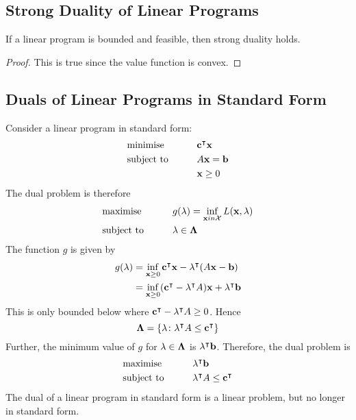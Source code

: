 \subsection{Strong Duality of Linear Programs}
\begin{theorem}
	If a linear program is bounded and feasible, then strong duality holds.
\end{theorem}
\begin{proof}
	This is true since the value function is convex.
\end{proof}

\subsection{Duals of Linear Programs in Standard Form}
Consider a linear program in standard form:
\begin{alignat*}{2}
	 & \text{minimise}   & \qquad & \vb c^\intercal \vb x \\
	 & \text{subject to} &        & A \vb x = \vb b        \\
	 &                   &        & \vb x \geq 0
\end{alignat*}
The dual problem is therefore
\begin{alignat*}{2}
	 & \text{maximise}   & \qquad & g(\vb \lambda) = \inf_{\vb x in \mathcal X} L(\vb x, \vb \lambda) \\
	 & \text{subject to} &        & \vb \lambda \in \vb \Lambda                                       \\
\end{alignat*}
The function \( g \) is given by
\begin{align*}
	g(\vb \lambda) & = \inf_{\vb x \geq 0} \vb c^\intercal \vb x - \vb \lambda^\intercal (A \vb x - \vb b)                 \\
	               & = \inf_{\vb x \geq 0} (\vb c^\intercal - \vb \lambda^\intercal A)\vb x + \vb \lambda^\intercal \vb b
\end{align*}
This is only bounded below where \( \vb c^\intercal - \vb \lambda^\intercal A \geq 0 \).
Hence
\[
	\vb \Lambda = \qty{\vb \lambda \colon \vb \lambda^\intercal A \leq \vb c^\intercal}
\]
Further, the minimum value of \( g \) for \( \vb \lambda \in \vb \Lambda \) is \( \vb \lambda^\intercal \vb b \).
Therefore, the dual problem is
\begin{alignat*}{2}
	 & \text{maximise}   & \qquad & \vb \lambda^\intercal \vb b                   \\
	 & \text{subject to} &        & \vb \lambda^\intercal A \leq \vb c^\intercal \\
\end{alignat*}
The dual of a linear program in standard form is a linear problem, but no longer in standard form.

